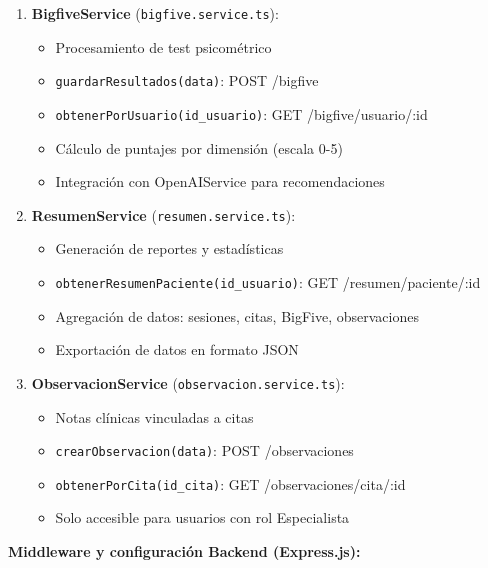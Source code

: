 \documentclass[12pt,a4paper]{report}
\numberwithin{figure}{section}
\begin{document}
\begin{enumerate}
  \item \textbf{BigfiveService} (\texttt{bigfive.service.ts}):
  \begin{itemize}
    \item Procesamiento de test psicométrico
    \item \texttt{guardarResultados(data)}: POST /bigfive
    \item \texttt{obtenerPorUsuario(id\_usuario)}: GET /bigfive/usuario/:id
    \item Cálculo de puntajes por dimensión (escala 0-5)
    \item Integración con OpenAIService para recomendaciones
  \end{itemize}
  
  \item \textbf{ResumenService} (\texttt{resumen.service.ts}):
  \begin{itemize}
    \item Generación de reportes y estadísticas
    \item \texttt{obtenerResumenPaciente(id\_usuario)}: GET /resumen/paciente/:id
    \item Agregación de datos: sesiones, citas, BigFive, observaciones
    \item Exportación de datos en formato JSON
  \end{itemize}
  
  \item \textbf{ObservacionService} (\texttt{observacion.service.ts}):
  \begin{itemize}
    \item Notas clínicas vinculadas a citas
    \item \texttt{crearObservacion(data)}: POST /observaciones
    \item \texttt{obtenerPorCita(id\_cita)}: GET /observaciones/cita/:id
    \item Solo accesible para usuarios con rol Especialista
  \end{itemize}
\end{enumerate}

\textbf{Middleware y configuración Backend (Express.js):}
\end{document}
